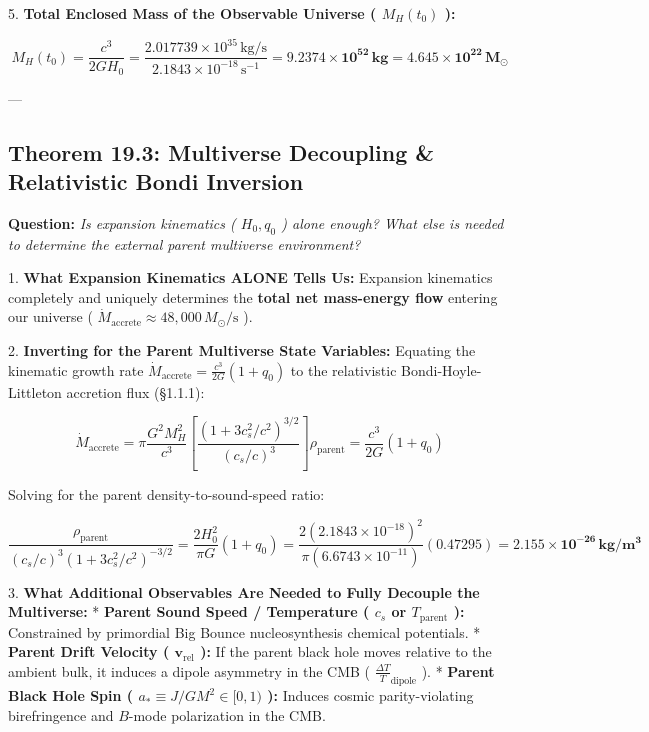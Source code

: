\documentclass[11pt,a4paper]{article}
\theoremstyle{definition}
\theoremstyle{remark}
\begin{document}
5. \textbf{Total Enclosed Mass of the Observable Universe ( $M_H(t_0)$ ):}


\begin{equation}
M_H(t_0) = \frac{c^3}{2 G H_0} = \frac{2.017739 \times 10^{35} \, \mathrm{kg/s}}{2.1843 \times 10^{-18} \, \mathrm{s^{-1}}} = \mathbf{9.2374 \times 10^{52} \, kg} = \mathbf{4.645 \times 10^{22} \, M_\odot}
\end{equation}


---

\subsection{Theorem 19.3: Multiverse Decoupling \& Relativistic Bondi Inversion}

\textbf{Question:} \textit{Is expansion kinematics ( $H_0, q_0$ ) alone enough? What else is needed to determine the external parent multiverse environment?}

1. \textbf{What Expansion Kinematics ALONE Tells Us:}
Expansion kinematics completely and uniquely determines the \textbf{total net mass-energy flow} entering our universe ( $\dot{M}_{\text{accrete}} \approx 48,000 \, M_\odot/\mathrm{s}$ ).

2. \textbf{Inverting for the Parent Multiverse State Variables:}
Equating the kinematic growth rate $\dot{M}_{\text{accrete}} = \frac{c^3}{2G}(1+q_0)$ to the relativistic Bondi-Hoyle-Littleton accretion flux (\S 1.1.1):


\begin{equation}
\dot{M}_{\text{accrete}} = \pi \frac{G^2 M_H^2}{c^3} [ \frac{(1 + 3 c_s^2/c^2)^{3/2}}{(c_s/c)^3} ] \rho_{\text{parent}} = \frac{c^3}{2 G}(1 + q_0)
\end{equation}


Solving for the parent density-to-sound-speed ratio:


\begin{equation}
\boxed{\frac{\rho_{\text{parent}}}{(c_s/c)^3 \left( 1 + 3 c_s^2/c^2 \right)^{-3/2}} = \frac{2 H_0^2}{\pi G} (1 + q_0) = \frac{2 (2.1843 \times 10^{-18})^2}{\pi (6.6743 \times 10^{-11})} (0.47295) = \mathbf{2.155 \times 10^{-26} \, kg/m^3}}
\end{equation}


3. \textbf{What Additional Observables Are Needed to Fully Decouple the Multiverse:}
* \textbf{Parent Sound Speed / Temperature ( $c_s$ or $T_{\text{parent}}$ ):} Constrained by primordial Big Bounce nucleosynthesis chemical potentials.
* \textbf{Parent Drift Velocity ( $\mathbf{v}_{\text{rel}}$ ):} If the parent black hole moves relative to the ambient bulk, it induces a dipole asymmetry in the CMB ( $\frac{\Delta T}{T}_{\text{dipole}}$ ).
* \textbf{Parent Black Hole Spin ( $a_* \equiv J / G M^2 \in [0, 1)$ ):} Induces cosmic parity-violating birefringence and $B$-mode polarization in the CMB.
\end{document}
